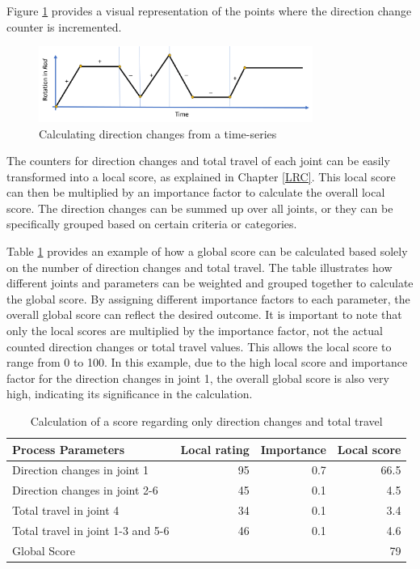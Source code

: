 Figure \ref{dirchange} provides a visual representation of the points where the direction change counter is incremented.


\begin{figure}[H]
	\centerline{\includegraphics[width=0.8\textwidth]{figures/dirchange.png}}
	\caption{Calculating direction changes from a time-series}
	\label{dirchange}
\end{figure}

The counters for direction changes and total travel of each joint can be easily transformed into a local score, as explained in Chapter \ref{LRC}. This local score can then be multiplied by an importance factor to calculate the overall local score. The direction changes can be summed up over all joints, or they can be specifically grouped based on certain criteria or categories.  

Table \ref{exampleDirTravel} provides an example of how a global score can be calculated based solely on the number of direction changes and total travel. The table illustrates how different joints and parameters can be weighted and grouped together to calculate the global score. By assigning different importance factors to each parameter, the overall global score can reflect the desired outcome. It is important to note that only the local scores are multiplied by the importance factor, not the actual counted direction changes or total travel values. This allows the local score to range from 0 to 100. In this example, due to the high local score and importance factor for the direction changes in joint 1, the overall global score is also very high, indicating its significance in the calculation.

\begin{table}[H]
	\centering
	\begin{tabular}{||l|r|r|r||}
		Process Parameters & Local rating & Importance & Local score\\
		\hline
		\hline
		\hline
		
		Direction changes in joint 1 & 95 & 0.7 & 66.5\\
		Direction changes in joint 2-6 & 45& 0.1&4.5\\
		Total travel in joint 4& 34& 0.1&3.4\\
		Total travel in joint 1-3 and 5-6& 46&0.1&4.6\\
		\hline
		\hline
		\hline
		Global Score& & &79\\
		\hline
		\hline
	\end{tabular}
	
	\caption{Calculation of a score regarding only direction changes and total travel}
	\label{exampleDirTravel}
\end{table}

